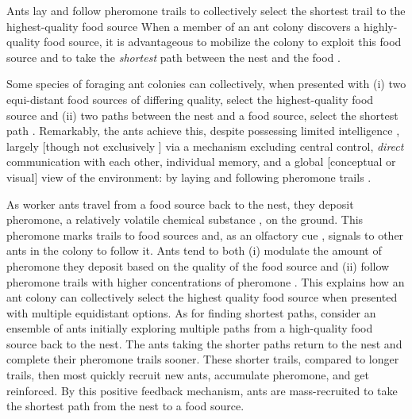 \documentclass[11pt, oneside]{article}
\begin{document}
\begin{mybox}[label=box:ants, breakable]{Ants lay and follow pheromone trails to collectively select the shortest trail to the highest-quality food source}
When a member of an ant colony discovers a highly-quality food source, it is advantageous to mobilize the colony to exploit this food source \cite{deneubourg1983probabilistic} and to take the \emph{shortest} path between the nest and the food \cite{goss1989self}.

Some species of foraging ant colonies can collectively, when presented with
(i) two equi-distant food sources of differing quality, select the highest-quality food source \cite{beckers1993modulation} and
(ii) two paths between the nest and a food source, select the shortest path \cite{goss1989self}.
Remarkably, the ants achieve this, despite possessing limited intelligence \cite{edelstein1995trail}, largely [though not exclusively \cite{evison2008combined,czaczkes2015trail,robinson2005no}] via a mechanism excluding central control, \emph{direct} communication with each other, individual memory, and a global [conceptual or visual] view of the environment: by laying and following pheromone trails \cite{czaczkes2015trail}.

As worker ants travel from a food source back to the nest, they deposit pheromone, a relatively volatile chemical substance \cite{david2009trail}, on the ground. 
This pheromone marks trails to food sources and, as an olfactory cue \cite{knaden2016sensory}, signals to other ants in the colony to follow it. \cite{david2009trail,deneubourg1990self}
Ants tend to both 
(i) modulate the amount of pheromone they deposit based on the quality of the food source \cite{beckers1993modulation}
and
(ii) follow pheromone trails with higher concentrations of pheromone \cite{beckers1993modulation,czaczkes2015trail}. 
This explains how an ant colony can collectively select the highest quality food source when presented with multiple equidistant options. 
As for finding shortest paths, consider an ensemble of ants initially exploring multiple paths from a high-quality food source back to the nest.
The ants taking the shorter paths return to the nest and complete their pheromone trails sooner. These shorter trails, compared to longer trails, then most quickly recruit new ants, accumulate pheromone, and get reinforced. By this positive feedback mechanism, ants are mass-recruited to take the shortest path from the nest to a food source. \cite{jackson2006communication,czaczkes2015trail,bonabeau1999swarm}


\end{mybox}
\end{document}
